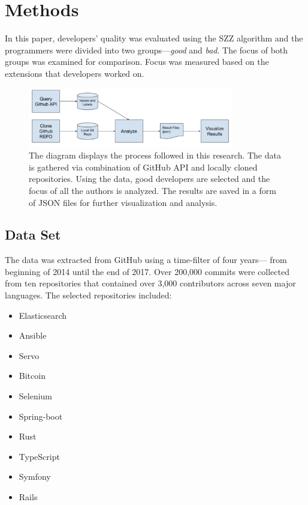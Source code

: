 
\chapter{Methods}\label{chapter:methods}

In this paper, developers’ quality was evaluated using the SZZ algorithm \parencite{Sliwerski} and the programmers were divided into two groups—\textit{good} and \textit{bad}. The focus of both groups was examined for comparison. Focus was measured based on the extensions that developers worked on. \par

\begin{figure}[htpb]
  \centering
  \includegraphics[width=0.8\textwidth]{figures/process}
  \caption[The Process]{The diagram displays the process followed in this research. The data is gathered via combination of GitHub API and locally cloned repositories. Using the data, good developers are selected and the focus of all the authors is analyzed. The results are saved in a form of JSON files for further visualization and analysis.} \label{fig:process}
\end{figure}

\section{Data Set}

The data was extracted from GitHub using a time-filter of four years— from beginning of 2014 until the end of 2017. Over 200,000 commits were collected from ten repositories that contained over 3,000 contributors across seven major languages. The selected repositories included: \par

\begin{itemize}
  \item Elasticsearch
  \item Ansible
  \item Servo
  \item Bitcoin
  \item Selenium
  \item Spring-boot
  \item Rust
  \item TypeScript 
  \item Symfony
  \item Rails
\end{itemize}

